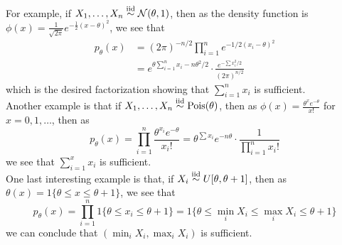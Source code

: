 For example, if $X_1, \ldots, X_n \overset{\tt{iid}}{\sim} \cal{N}(\theta, 1)$, then as the density function is $\phi(x) = \frac{1}{\sqrt{2\pi}}e^{-\frac{1}{2}(x - \theta)^2}$, we see that
\begin{align*}
    p_{\theta}(x) &= (2\pi)^{-n/2} \prod_{i = 1}^{n} e^{-1/2(x_i - \theta)^2}\\
    &= e^{\theta\sum_{i = 1}^{n} x_i - n\theta^2/2} \cdot \frac{e^{-\sum x_i^2/2}}{(2\pi)^{n/2}}
\end{align*}
which is the desired factorization showing that $\sum_{i = 1}^{n} x_i$ is sufficient.\\

Another example is that if $X_1, \ldots, X_n \overset{\tt{iid}}{\sim} \tt{Pois}(\theta)$, then as $\phi(x) = \frac{{\theta}^{x}e^{-\theta}}{x!}$ for $x = 0, 1, \ldots$, then as
\[ p_{\theta}(x) = \prod_{i = 1}^{n} \frac{\theta^{x_i}e^{-\theta}}{x_i!} = \theta^{\sum x_i}e^{-n\theta} \cdot \frac{1}{\prod_{i = 1}^{n} x_i!} \]
we see that $\sum_{i = 1}^{x} x_i$ is sufficient.\\

One last interesting example is that, if $X_i \overset{\tt{iid}}{\sim} U[\theta, \theta + 1]$, then as $\theta(x) = 1\{\theta \leq x \leq \theta + 1\}$, we see that
\[ p_{\theta}(x) = \prod_{i = 1}^{n} 1\{\theta \leq x_i \leq \theta + 1\} = 1\{\theta \leq \min_{i} X_i \leq \max_{i} X_i \leq \theta + 1\} \]
we can conclude that $(\min_{i} X_i, \max_{i} X_i)$ is sufficient.
